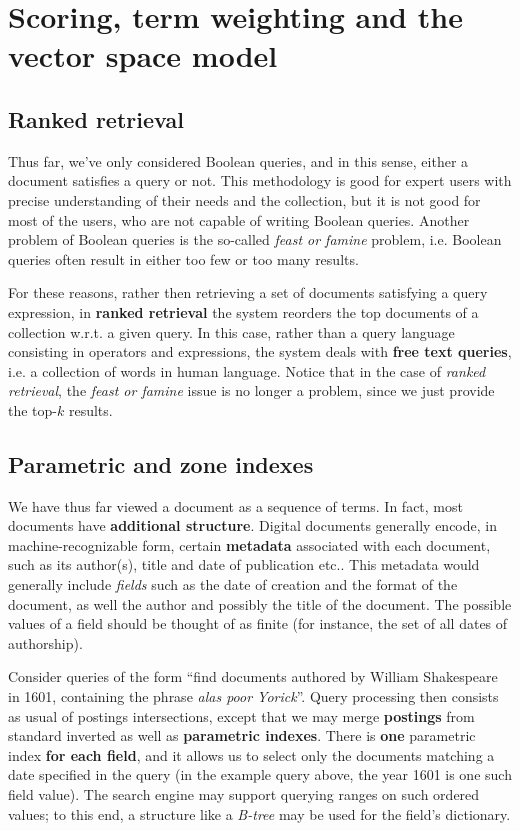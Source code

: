 \section{Scoring, term weighting and the vector space model}\label{ch7}

\subsection{Ranked retrieval}
Thus far, we've only considered Boolean queries, and in this sense, either a document satisfies a query or not. This methodology is good for expert users with precise understanding of their needs and the collection, but it is not good for most of the users, who are not capable of writing Boolean queries. Another problem of Boolean queries is the so-called \textit{feast or famine} problem, i.e. Boolean queries often result in either too few or too many results.

For these reasons, rather then retrieving a set of documents satisfying a query expression, in \textbf{ranked retrieval} the system reorders the top documents of a collection w.r.t. a given query. In this case, rather than a query language consisting in operators and expressions, the system deals with \textbf{free text queries}, i.e. a collection of words in human language. Notice that in the case of \textit{ranked retrieval}, the  \textit{feast or famine} issue is no longer a problem, since we just provide the top-$k$ results. 

\subsection{Parametric and zone indexes}
We have thus far viewed a document as a sequence of terms. In fact, most documents have \textbf{additional structure}. Digital documents generally encode, in machine-recognizable form, certain \textbf{metadata} associated with each document, such as its author(s), title and date of publication etc.. This metadata would generally include \textit{fields} such as the date of creation and the format of the document, as well the author and possibly the title of the document. The possible values of a field should be thought of as finite (for instance, the set of all dates of authorship). 

Consider queries of the form “find documents authored by William Shakespeare in 1601, containing the phrase \textit{alas poor Yorick}”. Query processing then consists as usual of postings intersections, except that we may merge \textbf{postings} from standard inverted as well as \textbf{parametric indexes}. There is \textbf{one} parametric index \textbf{for each field}, and it allows us to select only the documents matching a date specified in the query (in the example query above, the year 1601 is one such field value). The search engine may support querying ranges on such ordered values; to this end, a structure like a \textit{B-tree} may be used for the field’s dictionary. 

